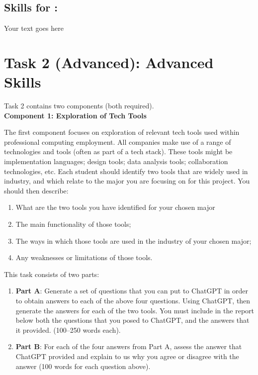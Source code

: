 \documentclass[a4paper, 11pt]{report}
\begin{document}
\subsection{Skills for \majD: \studD}

Your text goes here



\newpage
\section{Task 2 (Advanced): Advanced Skills}

Task 2 contains two components (both required).\\[2mm]

\textbf{Component 1: Exploration of Tech Tools}

The first component focuses on exploration of relevant tech tools used within professional computing employment. All companies make use of a range of technologies and tools (often as part of a tech stack). These tools might be implementation languages; design tools; data analysis tools; collaboration technologies, etc. Each student should identify two tools that are widely used in industry, and which relate to the major you are focusing on for this project. You should then describe:

\begin{enumerate}
\item What are the two tools you have identified for your chosen major
\item The main functionality of those tools;
\item The ways in which those tools are used in the industry of your chosen major;
\item Any weaknesses or limitations of those tools.
\end{enumerate}

This task consists of two parts:

\begin{enumerate}
\item \textbf{Part A}: Generate a set of questions that you can put to ChatGPT in order to obtain answers to each of the above four questions. Using ChatGPT, then generate the answers for each of the two tools. You must include in the report below both the questions that you posed to ChatGPT, and the answers that it provided.  (100–250 words each).
\item \textbf{Part B}: For each of the four answers from Part A, assess the answer that ChatGPT provided and explain to us why you agree or disagree with the answer (100 words for each question above).
\end{enumerate}
\end{document}
